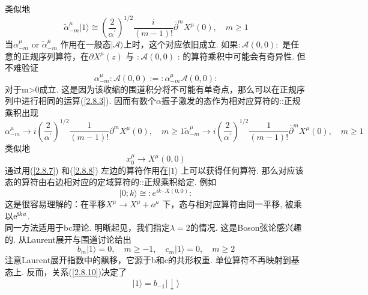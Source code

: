 类似地
\begin{equation}
\tilde{\alpha}_{-m}^{\mu}|1\rangle \cong\left(\frac{2}{\alpha^{\prime}}\right)^{1 / 2} \frac{i}{(m-1) !} \bar{\partial}^{m} X^{\mu}(0), \quad m \geq 1
\end{equation}
当$\alpha_{-m}^{\mu}$ or $\tilde{\alpha}_{-m}^{\mu}$ 作用在一般态$|\mathscr{A}\rangle$上时，这个对应依旧成立. 如果$: \mathscr{A}(0,0):$ 是任意的正规序列算符，在$\partial X^{\mu}(z)$ 与 $: \mathscr{A}(0,0)$ : 的算符乘积中可能会有奇异性. 但不难验证
\begin{equation}
\alpha_{-m}^{\mu}: \mathscr{A}(0,0):=: \alpha_{-m}^{\mu} \mathscr{A}(0,0):
\end{equation}
对于m>0成立. 这是因为该收缩的围道积分将不可能有单奇点，那么可以在正规序列中进行相同的运算(\ref{2.8.3}). 因而有数个$\alpha$振子激发的态作为相对应算符的::正规乘积出现
\begin{subequations}\label{2.8.7}
\begin{equation}
\alpha_{-m}^{\mu} \rightarrow i\left(\frac{2}{\alpha^{\prime}}\right)^{1 / 2} \frac{1}{(m-1) !} \partial^{m} X^{\mu}(0), \quad m \geq 1
\end{equation}
\begin{equation}
\tilde{\alpha}_{-m}^{\mu} \rightarrow i\left(\frac{2}{\alpha^{\prime}}\right)^{1 / 2} \frac{1}{(m-1) !} \bar{\partial}^{m} X^{\mu}(0), \quad m \geq 1
\end{equation}
\end{subequations}
类似地
\begin{equation}\label{2.8.8}
x_{0}^{\mu} \rightarrow X^{\mu}(0,0)
\end{equation}
通过用(\ref{2.8.7}) 和(\ref{2.8.8}) 左边的算符作用在$|1\rangle$ 上可以获得任何算符. 那么对应该态的算符由右边相对应的定域算符的::正规乘积给定. 例如
\begin{equation}
|0 ; k\rangle \cong: e^{i k \cdot X(0,0)}:
\end{equation}
这是很容易理解的：在平移$X^{\mu} \rightarrow X^{\mu}+a^{\mu}$ 下，态与相对应算符由同一平移, 被乘以$\mathrm{e} ^{\mathrm{i} ka}$. \\
同一方法适用于bc理论. 明晰起见，我们指定$\lambda=2$的情况. 这是Boson弦论感兴趣的. 从Laurent展开与围道讨论给出
\begin{equation}\label{2.8.10}
b_{m}|1\rangle=0, \quad m \geq-1, \quad c_{m}|1\rangle=0, \quad m \geq 2
\end{equation}
注意Laurent展开指数中的飘移，它源于b和c的共形权重. 单位算符不再映射到基态上. 反而，关系(\ref{2.8.10})决定了
\begin{equation}
|1\rangle=b_{-1}|\downarrow\rangle
\end{equation}
